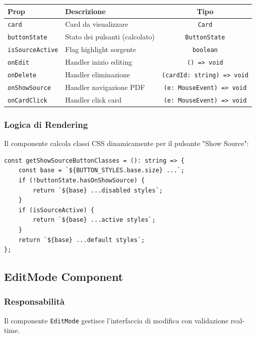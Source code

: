 \documentclass[11pt,a4paper]{article}
\begin{document}
\begin{tabularx}{\textwidth}{|l|X|c|}
\hline
\textbf{Prop} & \textbf{Descrizione} & \textbf{Tipo} \\
\hline
\texttt{card} & Card da visualizzare & \texttt{Card} \\
\hline
\texttt{buttonState} & Stato dei pulsanti (calcolato) & \texttt{ButtonState} \\
\hline
\texttt{isSourceActive} & Flag highlight sorgente & \texttt{boolean} \\
\hline
\texttt{onEdit} & Handler inizio editing & \texttt{() => void} \\
\hline
\texttt{onDelete} & Handler eliminazione & \texttt{(cardId: string) => void} \\
\hline
\texttt{onShowSource} & Handler navigazione PDF & \texttt{(e: MouseEvent) => void} \\
\hline
\texttt{onCardClick} & Handler click card & \texttt{(e: MouseEvent) => void} \\
\hline
\end{tabularx}

\subsubsection{Logica di Rendering}

Il componente calcola classi CSS dinamicamente per il pulsante "Show Source":

\begin{lstlisting}[style=typescript, caption=Calcolo Classi Dinamiche]
const getShowSourceButtonClasses = (): string => {
    const base = `${BUTTON_STYLES.base.size} ...`;
    if (!buttonState.hasOnShowSource) {
        return `${base} ...disabled styles`;
    }
    if (isSourceActive) {
        return `${base} ...active styles`;
    }
    return `${base} ...default styles`;
};
\end{lstlisting}

\subsection{EditMode Component}

\subsubsection{Responsabilità}

Il componente \texttt{EditMode} gestisce l'interfaccia di modifica con validazione real-time.
\end{document}
